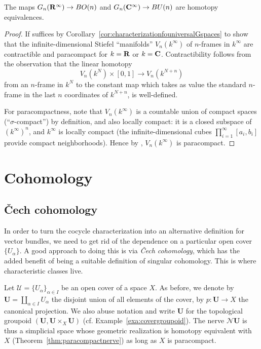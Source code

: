 \documentclass[a4paper,openany]{scrbook}
\newcommand{\nerve}{\mathcal N}
\begin{document}
\begin{corollary}
The maps $G_n(\mathbf R^\infty) \to BO(n)$ and $G_n(\mathbf C^\infty) \to BU(n)$ are homotopy equivalences.
\end{corollary}
\begin{proof}
If suffices by Corollary~\ref{cor:characterizationfouniversalGspaces} to show that the infinite-dimensional Stiefel ``manifolds'' $V_n(k^\infty)$ of $n$-frames in $k^\infty$ are contractible and paracompact for $k=\mathbf R$ or $k=\mathbf C$. Contractibility follows from the observation that the linear homotopy
\[
V_n(k^N)\times [0,1] \to V_n(k^{N+n})
\]
from an $n$-frame in $k^N$ to the constant map which takes as value the standard $n$-frame in the last $n$ coordinates of $k^{N+n}$, is well-defined. 

For paracompactness, note that $V_n(k^\infty)$ is a countable union of compact spaces (``$\sigma$-compact'') by definition, and also locally compact: it is a closed subspace of $(k^\infty)^n$, and $k^\infty$ is locally compact (the infinite-dimensional cubes $\prod_{i=1}^\infty [a_i,b_i]$ provide compact neighborhoods). Hence by \cite[Thm.~I.12.11]{bredon:topology-geometry}, $V_n(k^\infty)$ is paracompact.
\end{proof}

\chapter{Cohomology} \label{ch:cohomology}

\section{Čech cohomology}

In order to turn the cocycle characterization into an alternative definition for vector bundles, we need to get rid of the dependence on a particular open cover $\{U_\alpha\}$. A good approach to doing this is via \emph{Čech cohomology}, which has the added benefit of being a suitable definition of singular cohomology. This is where characteristic classes live.

Let $\mathcal U = \{U_\alpha\}_{\alpha \in I}$ be an open cover of a space $X$. As before, we denote by $\mathbf U = \coprod_{\alpha \in I} U_{\alpha}$ the disjoint union of all elements of the cover, by $p\colon \mathbf U \to X$ the canonical projection. We also abuse notation and write $\mathbf U$ for the topological groupoid $(\mathbf U, \mathbf U \times_X \mathbf U)$ (cf. Example~\ref{exa:covergroupoid}). The nerve $\nerve\mathbf U$ is thus a simplicial space whose geometric realization is homotopy equivalent with $X$ (Theorem~\ref{thm:paracompactnerve}) as long as $X$ is paracompact.
\end{document}
